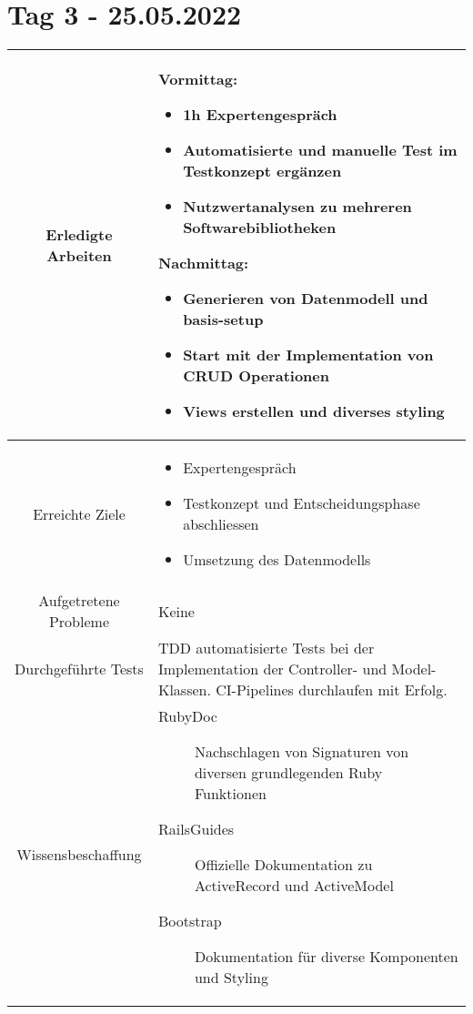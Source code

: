 \section{Tag 3 - 25.05.2022}

\begin{tabularx}{\textwidth}[H]{|c|X|}
    \hline
    Erledigte Arbeiten         &
    \textbf{Vormittag:}
    \begin{itemize}
        \item 1h Expertengespräch
        \item Automatisierte und manuelle Test im Testkonzept ergänzen
        \item Nutzwertanalysen zu mehreren Softwarebibliotheken
    \end{itemize}
    \textbf{Nachmittag:}
    \begin{itemize}
        \item Generieren von Datenmodell und basis-setup
        \item Start mit der Implementation von CRUD Operationen
        \item Views erstellen und diverses styling
    \end{itemize}
    \\ \hline

    Erreichte Ziele            &
    \begin{itemize}
        \item Expertengespräch
        \item Testkonzept und Entscheidungsphase abschliessen
        \item Umsetzung des Datenmodells
    \end{itemize}
    \\ \hline

    Aufgetretene Probleme      &
    Keine
    \\ \hline

    Durchgeführte Tests        &
    TDD automatisierte Tests bei der Implementation der Controller- und Model-Klassen. CI-Pipelines durchlaufen mit Erfolg.
    \\ \hline

    Wissensbeschaffung         &
    \begin{description}
        \item[RubyDoc] Nachschlagen von Signaturen von diversen grundlegenden Ruby Funktionen
        \item[RailsGuides] Offizielle Dokumentation zu ActiveRecord und ActiveModel
        \item[Bootstrap] Dokumentation für diverse Komponenten und Styling
    \end{description}
    \\ \hline


\end{tabularx}
